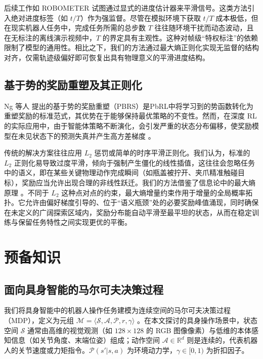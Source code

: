 后续工作如 ROBOMETER \cite{robometer2026} 试图通过显式的进度估计器来平滑信号。这类方法引入绝对进度标签（如 $t/T$）作为强监督。尽管在模拟环境下获取 $t/T$ 成本极低，但在现实机器人任务中，完成任务所需的总步数 $T$ 往往随环境干扰而动态波动，且在无标注的离线演示视频中，$T$ 的界定具有主观性。这种对帧级“特权标注”的依赖限制了模型的通用性。相比之下，我们的方法通过最大熵正则化实现无监督的结构对齐，仅需轨迹级偏好即可恢复出具有物理意义的平滑进度结构。

\subsection{基于势的奖励重塑及其正则化}
\label{sec:pbrs_regularization}

Ng 等人 \cite{ng1999policy} 提出的基于势的奖励重塑（PBRS）是PbRL中将学习到的势函数转化为重塑奖励的标准范式，其优势在于能够保持最优策略的不变性。然而，在深度 RL 的实际应用中，由于智能体策略不断演化，会引发严重的状态分布偏移，使奖励模型在未见状态下的预测失真并产生高方差梯度 \cite{liang2022rune}。

传统的解决方案往往应用 $L_2$ 惩罚或简单的时序平滑正则化。我们认为，标准的 $L_2$ 正则化易导致过度平滑，倾向于强制产生僵化的线性插值，这往往会忽略任务中的语义，即在某些关键物理动作完成瞬间（如瓶盖被拧开、夹爪精准触碰目标），奖励应当允许出现合理的非线性跃迁。我们的方法借鉴了信息论中的最大熵原理 \cite{shannon1948, jaynes1957}。不同于 $L_2$ 这种点对点的约束，最大熵增量约束作用于增量的全局概率拓扑。它允许由偏好梯度引导的、位于“语义瓶颈”处的必要奖励峰值涌现，同时确保在未定义的广阔探索区域内，奖励分布能自动平滑至最平坦的状态，从而在稳定训练与保留任务特性之间实现更优的平衡。

\section{预备知识}

\subsection{面向具身智能的马尔可夫决策过程}

我们将具身智能中的机器人操作任务建模为连续空间的马尔可夫决策过程（MDP），定义为元组 $\mathcal{M} = \langle \mathcal{S}, \mathcal{A}, \mathcal{P}, r, \gamma \rangle$ \cite{sutton2018}。在本文探讨的具身操作场景中，状态空间 $\mathcal{S}$ 通常由高维的视觉观测（如 $128 \times 128$ 的 RGB 图像像素）与低维的本体感知信息（如关节角度、末端位姿）组成；动作空间 $\mathcal{A} \in \mathbb{R}^d$ 则是连续的，代表机器人的关节速度或力矩指令。$\mathcal{P}(s'|s,a)$ 为环境动力学，$\gamma \in [0, 1)$ 为折扣因子。

